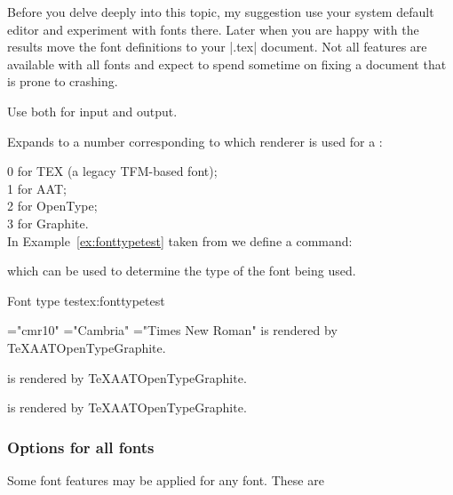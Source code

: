 Before you delve deeply into this topic, my suggestion use your system default editor and experiment with fonts there. Later when you are happy with the results move the font definitions to your |.tex| document. Not all features are available with all fonts and expect to spend sometime on fixing a document that is prone to crashing.

Use \utfviii both for input and output.

\CMDI{\XeTeXfonttype}
Expands to a number corresponding to which renderer is used for a :

0 for TEX (a legacy TFM-based font);\\
1 for AAT;\\
2 for OpenType;\\
3 for Graphite.\\

In Example~\ref{ex:fonttypetest} taken from \citep{xetexreference} we define a command:

\CMDI{\whattype}

which can be used to determine the type of the font being used.

\begin{texexample}{Font type test}{ex:fonttypetest}
{
\newcommand\whattype[1]{%
  \texttt{\fontname#1} is rendered by
  \ifcase\XeTeXfonttype#1\TeX\or AAT\or OpenType\or Graphite\fi.\par}
\font\1="cmr10"
\font\2="Cambria"
\font\3="Times New Roman"
\whattype\1 \whattype\2 \whattype\3
}
\end{texexample}

\newenvironment{optdesc}
  {\begin{description}[font=\ttfamily,style=nextline,leftmargin=1.5cm]}
  {\end{description}}

\subsubsection{Options for all fonts}

Some font features may be applied for any font. These are

